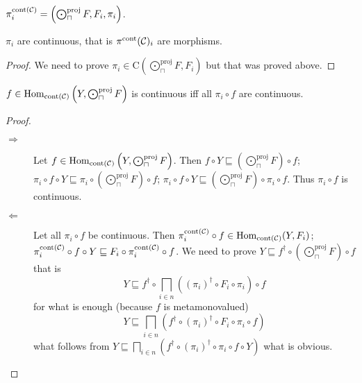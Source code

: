 \begin{defn}
  $\pi^{\operatorname{cont} (\mathcal{C})}_i = \left( \bigodot^{\text{proj}}_{\sqcap} F , F_i ,
  \pi_i \right)$.
\end{defn}

\begin{prop}
  $\pi_i$ are continuous, that is $\pi^{\operatorname{cont}}
  (\mathcal{C})_i$ are morphisms.
\end{prop}

\begin{proof}
  We need to prove $\pi_i \in \mathrm{C} \left( \bigodot^{\text{proj}}_{\sqcap} F , F_i \right)$
  but that was proved above.
\end{proof}

\begin{lem}
  $f \in \operatorname{Hom}_{\operatorname{cont} (\mathcal{C})} \left( Y ,
  \bigodot^{\text{proj}}_{\sqcap} F \right)$ is continuous iff all $\pi_i \circ f$ are continuous.
\end{lem}

\begin{proof}
  ~
  \begin{description}
    \item[$\Rightarrow$] Let $f \in \operatorname{Hom}_{\operatorname{cont}
    (\mathcal{C})} \left( Y , \bigodot^{\text{proj}}_{\sqcap} F \right)$. Then $f \circ Y
    \sqsubseteq \left( \bigodot^{\text{proj}}_{\sqcap} F \right) \circ f$; $\pi_i \circ f \circ Y
    \sqsubseteq \pi_i \circ \left( \bigodot^{\text{proj}}_{\sqcap} F \right) \circ f$; $\pi_i
    \circ f \circ Y \sqsubseteq \left( \bigodot^{\text{proj}}_{\sqcap} F \right) \circ \pi_i \circ
    f$. Thus $\pi_i \circ f$ is continuous.
    
    \item[$\Leftarrow$] Let all $\pi_i \circ f$ be continuous. Then
    $\pi^{\operatorname{cont} (\mathcal{C})}_i \circ f \in
    \operatorname{Hom}_{\operatorname{cont} (\mathcal{C})} (Y , F_i)$;
    $\pi^{\operatorname{cont} (\mathcal{C})}_i \circ f \circ Y \sqsubseteq
    F_i \circ \pi^{\operatorname{cont} (\mathcal{C})}_i \circ f$. We need
    to prove $Y \sqsubseteq f^{\dagger} \circ \left( \bigodot^{\text{proj}}_{\sqcap} F \right)
    \circ f$ that is
    \[ Y \sqsubseteq f^{\dagger} \circ \bigsqcap_{i \in n} ((\pi_i)^{\dagger}
       \circ F_i \circ \pi_i) \circ f \]
    for what is enough (because $f$ is metamonovalued)
    \[ Y \sqsubseteq \bigsqcap_{i \in n} (f^{\dagger} \circ (\pi_i)^{\dagger}
       \circ F_i \circ \pi_i \circ f) \]
    what follows from $Y \sqsubseteq \bigsqcap_{i \in n} (f^{\dagger} \circ
    (\pi_i)^{\dagger} \circ \pi_i \circ f \circ Y)$ what is obvious.
  \end{description}
\end{proof}

